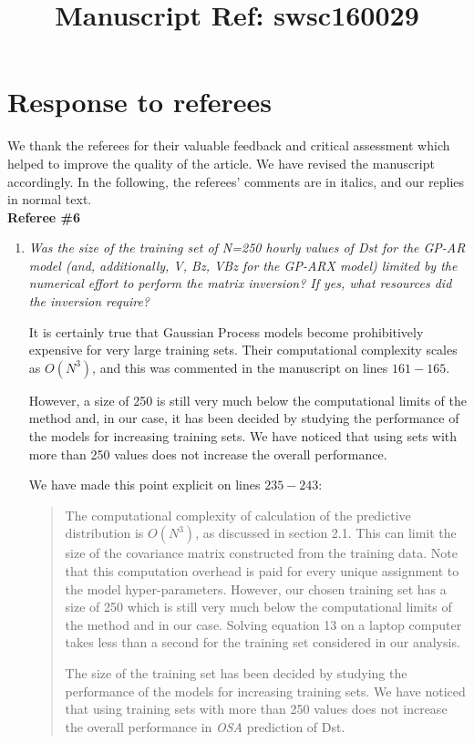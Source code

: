 \documentclass{article}
\begin{document}
\title{Manuscript Ref: swsc160029}
\maketitle

\section*{Response to referees}
We thank the referees for their valuable feedback and critical assessment which helped to improve the quality of the article. We have revised the manuscript accordingly. In the following, the referees' comments are in italics, and our replies in normal text.\\

\textbf{Referee \#6}
\begin{enumerate}
\item \emph{Was the size of the training set of N=250 hourly values of Dst for the GP-AR model (and, additionally, V, Bz, VBz for the GP-ARX model) limited by the numerical effort to perform the matrix inversion? If yes, what resources did the inversion require?}

It is certainly true that Gaussian Process models become prohibitively expensive for very large training sets. Their computational complexity scales as $O(N^3)$, and this was commented in the manuscript on lines $161-165$.

However, a size of 250 is still very much below the computational limits of the method and, in our case, it has been decided by studying the performance of the models for increasing training sets. We have noticed that using sets with more than 250 values does not increase the overall performance.

We have made this point explicit on lines $235-243$: \blockquote{The computational complexity of calculation of the predictive distribution is $O(N^3)$, as discussed in section 2.1. This can limit the size of the covariance matrix constructed from the training data. Note that this computation overhead is paid for every unique assignment to the model hyper-parameters. However, our chosen training set has a size of 250 which is still very much below the computational limits of the method and in our case. Solving equation 13 on a laptop computer takes less than a second for the training set considered in our analysis. 

The size of the training set has been decided by studying the performance of the models for increasing training sets. We have noticed that using training sets with more than 250 values does not increase the overall performance in \emph{OSA} prediction of Dst. 
}


\end{enumerate}
\end{document}
